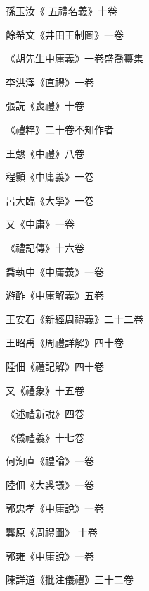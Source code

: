 \begin{pinyinscope}
 孫玉汝《
 五禮名義》十卷



 餘希文《井田王制圖》一卷



 《胡先生中庸義》一卷盛喬纂集



 李洪澤《直禮》一卷



 張詵《喪禮》十卷



 《禮粹》二十卷不知作者



 王愨《中禮》八卷



 程顥《中庸義》一卷



 呂大臨《大學》一卷



 又《中庸》一卷



 《禮記傳》十六卷



 喬執中《中庸義》一卷



 游酢《中庸解義》五卷



 王安石《新經周禮義》二十二卷



 王昭禹《周禮詳解》四十卷



 陸佃《禮記解》四十卷



 又《禮象》十五卷



 《述禮新說》四卷



 《儀禮義》十七卷



 何洵直《禮論》一卷



 陸佃《大裘議》一卷



 郭忠孝《中庸說》一卷



 龔原《周禮圖》
 十卷



 郭雍《中庸說》一卷



 陳詳道《批注儀禮》三十二卷




\end{pinyinscope}
